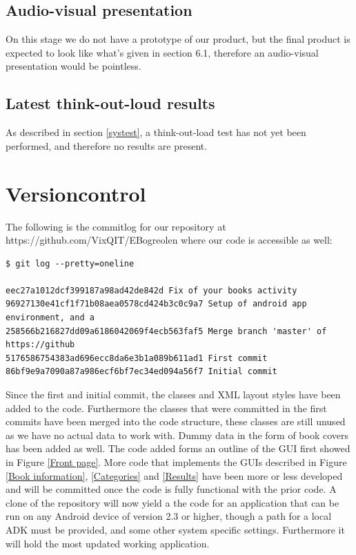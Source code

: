 \message{ !name(Rapport.tex)}\documentclass[12pt]{article}
\begin{document}
\subsection{Audio-visual presentation}
On this stage we do not have a prototype of our product, but the final product is expected to look like what's given in section 6.1, therefore an audio-visual presentation would be pointless.

\subsection{Latest think-out-loud results}
As described in section \ref{systest}, a think-out-load test has not yet been performed, and therefore no results are present.
\newpage
\section{Versioncontrol}

The following is the commitlog for our repository at https://github.com/VixQIT/EBogreolen where our code is accessible as well:
\begin{verbatim}
$ git log --pretty=oneline

eec27a1012dcf399187a98ad42de842d Fix of your books activity
96927130e41cf1f71b08aea0578cd424b3c0c9a7 Setup of android app environment, and a
258566b216827dd09a6186042069f4ecb563faf5 Merge branch 'master' of https://github
5176586754383ad696ecc8da6e3b1a089b611ad1 First commit
86bf9e9a7090a87a986ecf6bf7ec34ed094a56f7 Initial commit
\end{verbatim}
Since the first and initial commit, the classes and XML layout styles have been added to the code. Furthermore the classes that were committed in the first commits have been merged into the code structure, these classes are still unused as we have no actual data to work with. Dummy data in the form of book covers has been added as well. The code added forms an outline of the GUI first showed in Figure \ref{Front page}. More code that implements the GUIs described in Figure \ref{Book information}, \ref{Categories} and \ref{Results} have been more or less developed and will be committed once the code is fully functional with the prior code. A clone of the repository will now yield a the code for an application that can be run on any Android device of version 2.3 or higher, though a path for a local ADK must be provided, and some other system specific settings. Furthermore it will hold the most updated working application.
\end{document}
